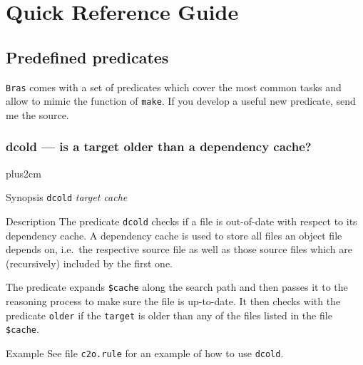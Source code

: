 \documentclass[11pt]{scrartcl}
\newcommand{\Bras}{\texttt{Bras}}
\newcommand{\make}{\texttt{make}}
\begin{document}
\section{Quick Reference Guide}
\newcommand{\Tt}[1]{\texttt{#1}}
\newcommand{\It}[1]{\textit{#1}}
\newcommand{\Flash}[1]{\fbox{\bfseries #1}}
\newcommand{\Sflabel}[1]{%
  \parbox[b]{\labelwidth}{%
    \makebox[1pt][l]{\textsf{\bfseries#1:}}\\\strut}}
  
\newenvironment{Describe}
{\vskip0pt plus2cm\begin{list}{}{\renewcommand{\makelabel}{\Sflabel}}}
{\end{list}\pagebreak[2]}

\subsection{Predefined predicates}
\label{sec:predicates}

\Bras{} comes with a set of predicates which cover the most common
tasks and allow to mimic the function of \make{}. If you develop a
useful new predicate, send me the source.

\subsubsection{dcold --- is a target older than a dependency cache?}
\begin{Describe}
\item[Synopsis] \Tt{dcold} \It{target cache}
\item[Description] The predicate \texttt{dcold} checks if a file is
  out-of-date with respect to its dependency cache. A dependency cache
  is used to store all files an object file depends on, i.e.\ the
  respective source file as well as those source files which are
  (recursively) included by the first one.
  
  The predicate expands \texttt{\$cache} along the search path and
  then passes it to the reasoning process to make sure the file is
  up-to-date. It then checks with the predicate \texttt{older} if the
  \texttt{target} is older than any of the files listed in the file
  \texttt{\$cache}.
\item[Example] See file \texttt{c2o.rule} for an example of how to use 
  \texttt{dcold}.
\end{Describe}
\end{document}
